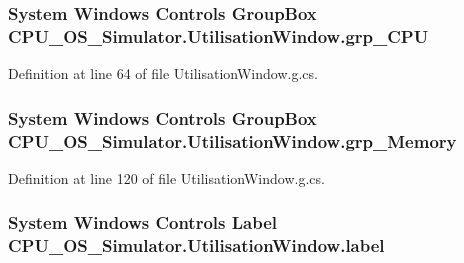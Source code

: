 \subsubsection[{grp\+\_\+\+C\+P\+U}]{\setlength{\rightskip}{0pt plus 5cm}System Windows Controls Group\+Box C\+P\+U\+\_\+\+O\+S\+\_\+\+Simulator.\+Utilisation\+Window.\+grp\+\_\+\+C\+P\+U\hspace{0.3cm}{\ttfamily [package]}}\label{class_c_p_u___o_s___simulator_1_1_utilisation_window_a05acd35d0b339101c49d313480d4708a}


Definition at line 64 of file Utilisation\+Window.\+g.\+cs.

\hypertarget{class_c_p_u___o_s___simulator_1_1_utilisation_window_a8eb460220e13b601c32417a50f108590}{}
\subsubsection[{grp\+\_\+\+Memory}]{\setlength{\rightskip}{0pt plus 5cm}System Windows Controls Group\+Box C\+P\+U\+\_\+\+O\+S\+\_\+\+Simulator.\+Utilisation\+Window.\+grp\+\_\+\+Memory\hspace{0.3cm}{\ttfamily [package]}}\label{class_c_p_u___o_s___simulator_1_1_utilisation_window_a8eb460220e13b601c32417a50f108590}


Definition at line 120 of file Utilisation\+Window.\+g.\+cs.

\hypertarget{class_c_p_u___o_s___simulator_1_1_utilisation_window_aa45faea5a6347cb26639a4e279117ecf}{}
\subsubsection[{label}]{\setlength{\rightskip}{0pt plus 5cm}System Windows Controls Label C\+P\+U\+\_\+\+O\+S\+\_\+\+Simulator.\+Utilisation\+Window.\+label\hspace{0.3cm}{\ttfamily [package]}}\label{class_c_p_u___o_s___simulator_1_1_utilisation_window_aa45faea5a6347cb26639a4e279117ecf}


